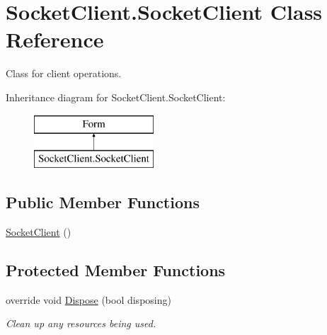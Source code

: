 \hypertarget{class_socket_client_1_1_socket_client}{}\section{Socket\+Client.\+Socket\+Client Class Reference}
\label{class_socket_client_1_1_socket_client}


Class for client operations.  


Inheritance diagram for Socket\+Client.\+Socket\+Client\+:\begin{figure}[H]
\begin{center}
\leavevmode
\includegraphics[height=2.000000cm]{class_socket_client_1_1_socket_client}
\end{center}
\end{figure}
\subsection*{Public Member Functions}
\begin{DoxyCompactItemize}
\item 
\hyperlink{class_socket_client_1_1_socket_client_aa6b5f080048da540d30bfe849b1e3260}{Socket\+Client} ()
\end{DoxyCompactItemize}
\subsection*{Protected Member Functions}
\begin{DoxyCompactItemize}
\item 
override void \hyperlink{class_socket_client_1_1_socket_client_ab28be4e020b665a2b8cc879beac14062}{Dispose} (bool disposing)
\begin{DoxyCompactList}\small\item\em Clean up any resources being used. \end{DoxyCompactList}\end{DoxyCompactItemize}
